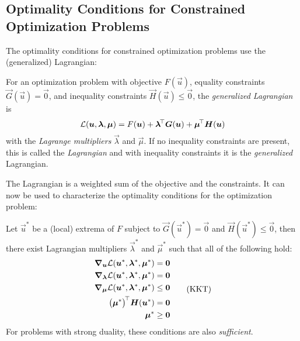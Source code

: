 		\subsection{Optimality Conditions for Constrained Optimization Problems} %
			The optimality conditions for constrained optimization problems use the (generalized) Lagrangian:
			\begin{definition}
				For an optimization problem with objective \(F(\vec{u})\), equality constraints \( \vec{G}(\vec{u}) = \vec{0} \), and inequality constraints \( \vec{H}(\vec{u}) \leq \vec{0} \), the \emph{generalized Lagrangian} is
				\begin{equation}
					\mathcal{L}(\bm{u}, \bm{\lambda}, \bm{\mu}) = F(\bm{u}) + \bm{\lambda}^{\!\top} \bm{G}(\bm{u}) + \bm{\mu}^{\!\top} \bm{H}(\bm{u})
				\end{equation}
				with the \emph{Lagrange multipliers} \(\vec{\lambda}\) and \(\vec{\mu}\). If no inequality constraints are present, this is called the \emph{Lagrangian} and with inequality constraints it is the \emph{generalized} Lagrangian.
			\end{definition}
			The Lagrangian is a weighted sum of the objective and the constraints. It can now be used to characterize the optimality conditions for the optimization problem:
			\begin{theorem}
				Let \(\vec{u}^\ast\) be a (local) extrema of \(F\) subject to \( \vec{G}(\vec{u}^\ast) = \vec{0} \) and \( \vec{H}(\vec{u}^\ast) \leq \vec{0} \), then there exist Lagrangian multipliers \( \vec{\lambda}^\ast \) and \( \vec{\mu}^\ast \) such that all of the following hold:
				\begin{equation}
					\begin{aligned}
						\grad_{\bm{u}} \mathcal{L}(\bm{u}^\ast, \bm{\lambda}^\ast, \bm{\mu}^\ast)       & = \bm{0}    \\
						\grad_{\bm{\lambda}} \mathcal{L}(\bm{u}^\ast, \bm{\lambda}^\ast, \bm{\mu}^\ast) & = \bm{0}    \\
						\grad_{\bm{\mu}} \mathcal{L}(\bm{u}^\ast, \bm{\lambda}^\ast, \bm{\mu}^\ast)     & \leq \bm{0} \\
						\bigl(\bm{\mu}^\ast\bigr)^{\!\top} \bm{H}(\bm{u}^\ast)                        & = \bm{0}    \\
						\bm{\mu}^\ast                                                                      & \geq \bm{0}
					\end{aligned}  \tag{KKT}\label{eqn:kkt}
				\end{equation}
				For problems with strong duality, these conditions are also \emph{sufficient}.
			\end{theorem}
